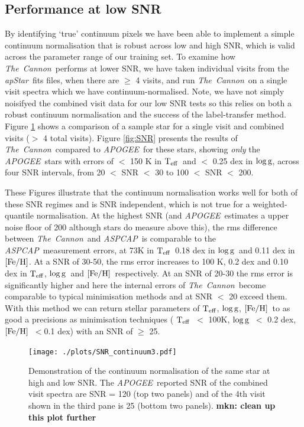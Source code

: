 \documentclass[12pt, preprint]{aastex}
\newcommand{\teff}{\mbox{$\rm T_{eff}$}}
\newcommand{\feh}{\mbox{$\rm [Fe/H]$}}
\newcommand{\logg}{\mbox{$\rm \log g$}}
\newcommand{\tc}{\textsl{The~Cannon}}
\newcommand{\apogee}{\textsl{APOGEE}}
\newcommand{\aspcap}{\textsl{ASPCAP}}
\newcommand{\apstar}{\textsl{apStar}}
\begin{document}
 \subsection{Performance at low SNR}


By identifying `true' continuum pixels we have been able to implement a simple continuum normalisation that is robust across low and high SNR, which is valid across the parameter range of our training set. To examine how \tc\ performs at lower SNR, we have taken individual visits from the \apstar\ fits files, when there are $\ge$ 4 visits, and run \tc\ on a single visit spectra which we have continuum-normalised. Note, we have not simply noisifyed the combined visit data for our low SNR tests so this relies on both a robust continuum normalisation and the success of the label-transfer method. Figure \ref{fig:lowsnr} shows a comparison of a sample star for a single visit and combined visits ($>$ 4 total visits). Figure \ref{fig:SNR} presents the results of \tc\ compared to \apogee\ for these stars, showing \textit{only} the \apogee\ stars with errors of $<$ 150 K in \teff\ and $<$ 0.25 dex in \logg, across four SNR intervals, from 20 $<$ SNR $<$ 30 to 100 $<$ SNR $<$ 200. 


These Figures illustrate that the continuum normalisation works well for both of these SNR regimes and is SNR independent, which is not true for a weighted-quantile normalisation. At the highest SNR (and \apogee\ estimates a upper noise floor of 200 although stars do measure above this), the rms difference between \tc\ and \aspcap\ is comparable to the \aspcap\ measurement errors, at 73K in \teff\, 0.18 dex in \logg\ and 0.11 dex in \feh.  At a SNR of 30-50, the rms error increases to 100 K, 0.2 dex and 0.10 dex in \teff, \logg\ and \feh\, respectively. At an SNR of 20-30 the rms error is significantly higher and here the internal errors of \tc\ become comparable to typical minimisation methods and at SNR $<$ 20 exceed them. With this method we can return stellar parameters of \teff, \logg, \feh\ to as good a precisions as minimisation techniques ( \teff\ $<$ 100K, \logg\ $<$ 0.2 dex, \feh\ $< $0.1 dex) with an SNR of $\ge$ 25. 
 
 \begin{figure}[!h]
  \texttt{[image: ./plots/SNR\_continuum3.pdf]}
  \caption{Demonstration of the continuum normalisation of the same star at high and low SNR. The \apogee\ reported SNR of the combined visit spectra are SNR = 120 (top two panels) and of the 4th visit shown in the third pane is 25 (bottom two panels). \textbf{mkn: clean up this plot further} }
\label{fig:lowsnr}
\end{figure}
\end{document}
